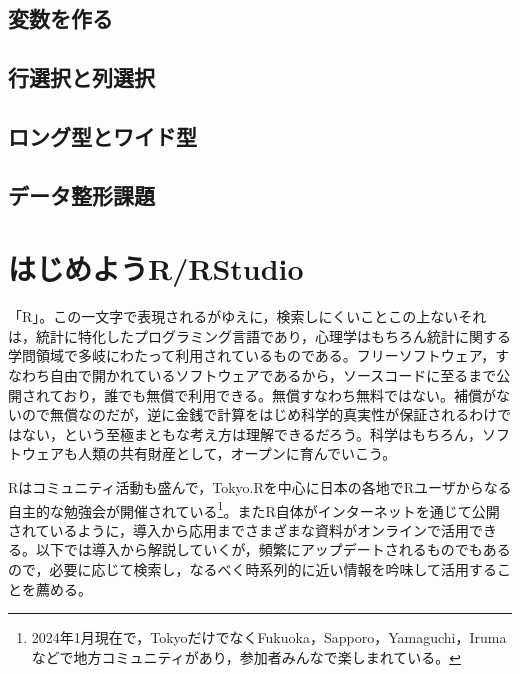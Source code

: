 \documentclass[
  a4paper,
]{ltjsbook}
\begin{document}
\hypertarget{ux5909ux6570ux3092ux4f5cux308b-4}{%
\section{変数を作る}\label{ux5909ux6570ux3092ux4f5cux308b-4}}

\hypertarget{ux884cux9078ux629eux3068ux5217ux9078ux629e-4}{%
\section{行選択と列選択}\label{ux884cux9078ux629eux3068ux5217ux9078ux629e-4}}

\hypertarget{ux30edux30f3ux30b0ux578bux3068ux30efux30a4ux30c9ux578b-4}{%
\section{ロング型とワイド型}\label{ux30edux30f3ux30b0ux578bux3068ux30efux30a4ux30c9ux578b-4}}

\hypertarget{ux30c7ux30fcux30bfux6574ux5f62ux8ab2ux984c-4}{%
\section{データ整形課題}\label{ux30c7ux30fcux30bfux6574ux5f62ux8ab2ux984c-4}}

\cleardoublepage
{}
{}
\appendix

\hypertarget{ux306fux3058ux3081ux3088ux3046rrstudio-1}{%
\chapter{はじめようR/RStudio}\label{ux306fux3058ux3081ux3088ux3046rrstudio-1}}

「R」。この一文字で表現されるがゆえに，検索しにくいことこの上ないそれは，統計に特化したプログラミング言語であり，心理学はもちろん統計に関する学問領域で多岐にわたって利用されているものである。フリーソフトウェア，すなわち自由で開かれているソフトウェアであるから，ソースコードに至るまで公開されており，誰でも無償で利用できる。無償すなわち無料ではない。補償がないので無償なのだが，逆に金銭で計算をはじめ科学的真実性が保証されるわけではない，という至極まともな考え方は理解できるだろう。科学はもちろん，ソフトウェアも人類の共有財産として，オープンに育んでいこう。

Rはコミュニティ活動も盛んで，Tokyo.Rを中心に日本の各地でRユーザからなる自主的な勉強会が開催されている\footnote{2024年1月現在で，TokyoだけでなくFukuoka，Sapporo，Yamaguchi，Irumaなどで地方コミュニティがあり，参加者みんなで楽しまれている。}。またR自体がインターネットを通じて公開されているように，導入から応用までさまざまな資料がオンラインで活用できる。以下では導入から解説していくが，頻繁にアップデートされるものでもあるので，必要に応じて検索し，なるべく時系列的に近い情報を吟味して活用することを薦める。
\end{document}
